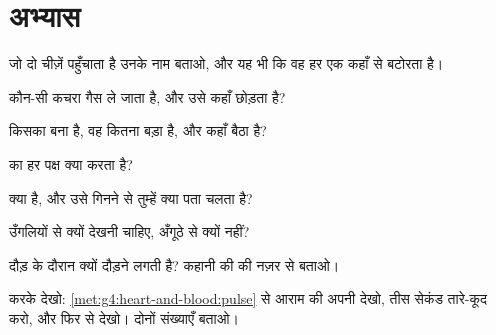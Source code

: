 \section{अभ्यास}

\begin{exercise}[$\star$]\label{exo:g4:heart-and-blood:1}
 जो दो चीज़ें पहुँचाता है उनके नाम बताओ, और यह भी कि वह हर एक
कहाँ से बटोरता है।
\end{exercise}

\begin{exercise}[$\star$]\label{exo:g4:heart-and-blood:2}
 कौन-सी कचरा गैस ले जाता है, और उसे कहाँ छोड़ता है?
\end{exercise}

\begin{exercise}[$\star$]\label{exo:g4:heart-and-blood:3}
 किसका बना है, वह कितना बड़ा है, और कहाँ बैठा है?
\end{exercise}

\begin{exercise}[$\star$]\label{exo:g4:heart-and-blood:4}
 का हर पक्ष क्या करता है?
\end{exercise}

\begin{exercise}[$\star$]\label{exo:g4:heart-and-blood:5}
 क्या है, और उसे गिनने से तुम्हें क्या पता चलता है?
\end{exercise}

\begin{exercise}[$\star$]\label{exo:g4:heart-and-blood:6}
 उँगलियों से क्यों देखनी चाहिए, अँगूठे से क्यों नहीं?
\end{exercise}

\begin{exercise}[$\star$]\label{exo:g4:heart-and-blood:7}
दौड़ के दौरान  क्यों दौड़ने लगती है? कहानी  की  की
नज़र से बताओ।
\end{exercise}

\begin{exercise}[$\star$]\label{exo:g4:heart-and-blood:8}
करके देखो: \cref{met:g4:heart-and-blood:pulse} से आराम की अपनी 
देखो, तीस सेकंड तारे-कूद करो, और फिर से देखो। दोनों संख्याएँ बताओ।
\end{exercise}

